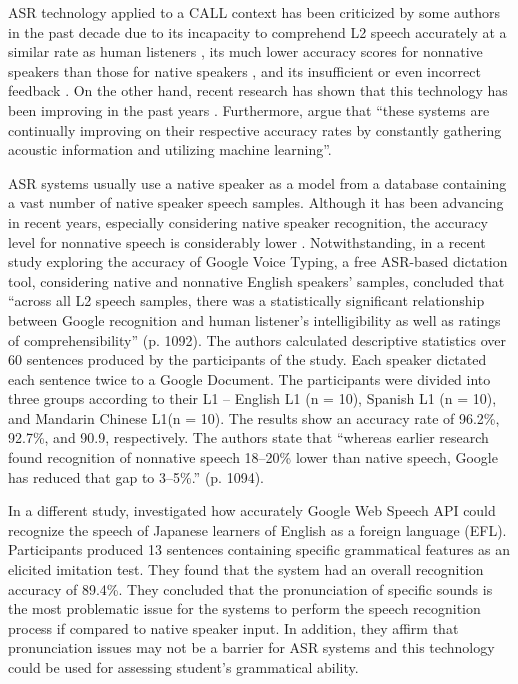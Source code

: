 \documentclass[english]{textolivre}
\begin{document}
ASR technology applied to a CALL context has been criticized by some authors in the past decade due to its incapacity to comprehend L2 speech accurately at a similar rate as human listeners \cite{derwing2000, kim2006, levis2013}, its much lower accuracy scores for nonnative speakers than those for native speakers \cite{ashwell2017, rogerson-revell2021}, and its insufficient or even incorrect feedback \cite{chen2011, demenko2010, levis2013, rogerson-revell2021}. On the other hand, recent research has shown that this technology has been improving in the past years \cite{ashwell2017, dizon2020, dizontang2020, mccrocklin2020, moussalli2020, bogach2021}. Furthermore, \textcite[p. 61]{ashwell2017} argue that “these systems are continually improving on their respective accuracy rates by constantly gathering acoustic information and utilizing machine learning”.

ASR systems usually use a native speaker as a model from a database containing a vast number of native speaker speech samples. Although it has been advancing in recent years, especially considering native speaker recognition, the accuracy level for nonnative speech is considerably lower \cite{rogerson-revell2021}. Notwithstanding, in a recent study exploring the accuracy of Google Voice Typing, a free ASR-based dictation tool, considering native and nonnative English speakers’ samples, \textcite{mccrocklin2020} concluded that “across all L2 speech samples, there was a statistically significant relationship between Google recognition and human listener’s intelligibility as well as ratings of comprehensibility” (p. 1092). The authors calculated descriptive statistics over 60 sentences produced by the participants of the study. Each speaker dictated each sentence twice to a Google Document. The participants were divided into three groups according to their L1 – English L1 (n = 10), Spanish L1 (n = 10), and Mandarin Chinese L1(n = 10). The results show an accuracy rate of 96.2\%, 92.7\%, and 90.9, respectively. The authors state that “whereas earlier research found recognition of nonnative speech 18–20\% lower than native speech, Google has reduced that gap to 3–5\%.” (p. 1094).

In a different study, \textcite{ashwell2017} investigated how accurately Google Web Speech API could recognize the speech of Japanese learners of English as a foreign language (EFL). Participants produced 13 sentences containing specific grammatical features as an elicited imitation test. They found that the system had an overall recognition accuracy of 89.4\%. They concluded that the pronunciation of specific sounds is the most problematic issue for the systems to perform the speech recognition process if compared to native speaker input. In addition, they affirm that pronunciation issues may not be a barrier for ASR systems and this technology could be used for assessing student’s grammatical ability.
\end{document}
